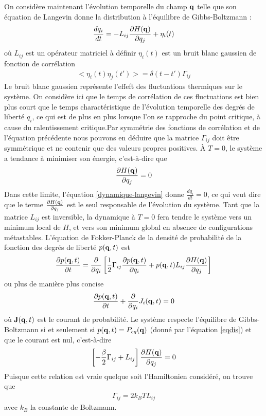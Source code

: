 On considère maintenant l'évolution temporelle du champ ${\bf q}$ telle que son équation de Langevin donne la distribution à l'équilibre de Gibbs-Boltzmann : 
\begin{align}
    \frac{d q_i}{dt} = -L_{ij}\frac{\partial H({\bf q})}{ \partial q_j} + \eta_i(t)
    \label{dynamique-langevin}
\end{align}
où $L_{ij}$ est un opérateur matriciel à définir $\eta_i(t)$ est un bruit blanc gaussien de fonction de corrélation
\begin{align}
   <  \eta_i(t)\eta_j(t') > =   \delta(t-t') \Gamma_{ij}
\end{align}
Le bruit blanc gaussien représente l'effeft des fluctuations thermiques sur le système. On considère ici que le temps de corrélation de ces fluctuations est bien plus court que le temps charactéristique de l'évolution temporelle des degrés de liberté $q_i$, ce qui est de plus en plus lorsque l'on se rapproche du point critique, à cause du ralentissement critique.Par symmétrie des fonctions de corrélation et de l'équation précédente nous pouvons en déduire que la matrice $\Gamma_{ij}$ doit être symmétrique et ne contenir que des valeurs propres positives.
À $T=0$, le système a tendance à minimiser son énergie, c'est-à-dire que
\begin{align}
    \frac{\partial H({\bf q})}{ \partial q_j} = 0
\end{align}
Dans cette limite, l'équation \ref{dynamique-langevin} donne $\frac{d q_i}{dt}=0$, ce qui veut dire que le terme $\frac{\partial H({\bf q})}{ \partial q_j}$ est le seul responsable de l'évolution du système.
Tant que la matrice $L_{ij}$ est inversible, la dynamique à $T=0$ fera tendre le système vers un minimum local de $H$, et vers son minimum global en absence de configurations métastables.
L'équation de Fokker-Planck de la densité de probabilité de la fonction des degrés de liberté $p({\bf q},t)$ est 
\begin{align}
    \frac{\partial p({\bf q},t)}{\partial t} = \frac{\partial}{\partial q_i} \left[\frac{1}{2}\Gamma_{ij}                 \frac{\partial p({\bf q},t)}{\partial q_i} + p({\bf q},t) L_{ij}\frac{\partial H({\bf q})}{ \partial q_j}\right]
\end{align}
ou plus de manière plus concise
\begin{align}
    \frac{\partial p({\bf q},t)}{\partial t} +\frac{\partial}{\partial q_i}J_i({\bf q},t)=0
    \label{courant}
\end{align}
où  ${\bf J}({\bf q},t)$ est le courant de probabilité. Le système respecte l'équilibre de Gibbs-Boltzmann si et seulement si $p({\bf q},t)=P_{eq}({\bf q})$ (donné par l'équation \ref{eqdis}) et que le courant est nul, c'est-à-dire
\begin{align}
    \left[-\frac{\beta}{2}\Gamma_{ij} + L_{ij}\right]\frac{\partial H({\bf q})}{ \partial q_j} = 0
\end{align}
Puisque cette relation est vraie quelque soit l'Hamiltonien considéré, on trouve que 
\begin{align}
    \Gamma_{ij}= 2 k_B T L_{ij}
\end{align}
avec $k_B$ la constante de Boltzmann.

